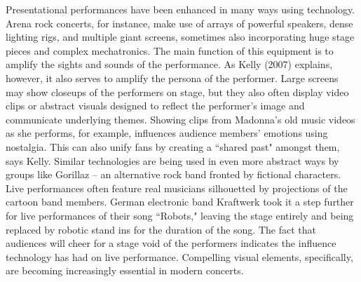 Presentational performances have been enhanced in many ways using technology. Arena rock concerts, for instance, make use of arrays of powerful speakers, dense lighting rigs, and multiple giant screens, sometimes also incorporating huge stage pieces and complex mechatronics. The main function of this equipment is to amplify the sights and sounds of the performance. As Kelly (2007) explains, however, it also serves to amplify the persona of the performer. Large screens may show closeups of the performers on stage, but they also often display video clips or abstract visuals designed to reflect the performer's image and communicate underlying themes. Showing clips from Madonna's old music videos as she performs, for example, influences audience members' emotions using nostalgia. This can also unify fans by creating a ``shared past" amongst them, says Kelly. Similar technologies are being used in even more abstract ways by groups like Gorillaz -- an alternative rock band fronted by fictional characters. Live performances often feature real musicians silhouetted by projections of the cartoon band members. German electronic band Kraftwerk took it a step further for live performances of their song ``Robots," leaving the stage entirely and being replaced by robotic stand ins for the duration of the song. The fact that audiences will cheer for a stage void of the performers indicates the influence technology has had on live performance. Compelling visual elements, specifically, are becoming increasingly essential in modern concerts.

